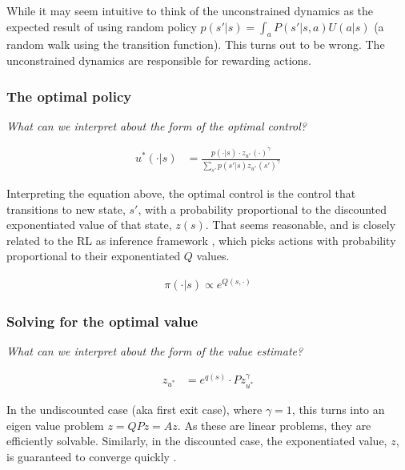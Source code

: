 While it may seem intuitive to think of the unconstrained dynamics as the expected result of using random policy
$p(s' | s) = \int_a P(s' | s, a)U(a|s)$ (a random walk using the transition function).
This turns out to be wrong. The unconstrained dynamics are responsible for rewarding actions.

\subsubsection{The optimal policy}

\begin{displayquote}
\textsl{What can we interpret about the form of the optimal control?}
\end{displayquote}

\begin{align*}
u^{* }(\cdot | s) &= \frac{p(\cdot | s)\cdot z_{u^{* }}(\cdot)^{\gamma}}{\sum_{s'} p(s' | s) z_{u^{* }}(s')^{\gamma}}
\end{align*}

Interpreting the equation above, the optimal control is the control that transitions to new state, $s'$, with a
probability proportional to the discounted exponentiated value of that state, $z(s)$.
That seems reasonable, and is closely related to the RL as inference framework \cite{Levinea},
which picks actions with probability proportional to their exponentiated $Q$ values.

\begin{align*}
\pi(\cdot|s) \propto e^{Q(s, \cdot)}
\end{align*}

\subsubsection{Solving for the optimal value}\label{solve-lmdp}

\begin{displayquote}
\textsl{What can we interpret about the form of the value estimate?}
\end{displayquote}

\begin{align*}
z_{u^{* }} &= e^{q(s)}\cdot P z_{u^{* }}^{\gamma}
\end{align*}

In the undiscounted case (aka first exit case), where $\gamma=1$, this turns into an eigen value
problem $z = QPz = Az$. As these are linear problems, they are efficiently solvable.
Similarly, in the discounted case, the exponentiated value, $z$, is guaranteed to converge quickly \cite{Todorov2009}.

